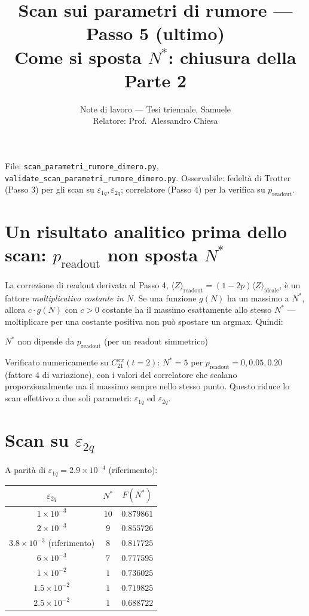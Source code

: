 \documentclass[11pt,a4paper]{article}
\title{\vspace{-1.5em}\color{inkblue}Scan sui parametri di rumore --- Passo 5 (ultimo)\\[0.2em]
\Large\normalfont\color{softgray}Come si sposta $N^*$: chiusura della Parte 2}
\author{Note di lavoro --- Tesi triennale, Samuele\\ Relatore: Prof.\ Alessandro Chiesa}
\date{}
\begin{document}
\sloppy
\maketitle
\thispagestyle{fancy}
\vspace{-2.2em}

File: \texttt{scan\_parametri\_rumore\_dimero.py},
\texttt{validate\_scan\_parametri\_rumore\_dimero.py}. Osservabile: fedeltà
di Trotter (Passo 3) per gli scan su $\varepsilon_{1q},\varepsilon_{2q}$;
correlatore (Passo 4) per la verifica su $p_\text{readout}$.

\section*{Un risultato analitico prima dello scan: $p_\text{readout}$ non sposta $N^*$}

La correzione di readout derivata al Passo 4, $\langle Z\rangle_\text{readout}=
(1-2p)\langle Z\rangle_\text{ideale}$, è un fattore \emph{moltiplicativo
costante in $N$}. Se una funzione $g(N)$ ha un massimo a $N^*$, allora
$c\cdot g(N)$ con $c>0$ costante ha il massimo esattamente allo stesso
$N^*$ --- moltiplicare per una costante positiva non può spostare un
argmax. Quindi:
\begin{keyeq}
\centering
$N^*$ non dipende da $p_\text{readout}$ (per un readout simmetrico)
\end{keyeq}
Verificato numericamente su $C_{21}^{xx}(t=2)$: $N^*=5$ per
$p_\text{readout}=0, 0.05, 0.20$ (fattore 4 di variazione), con i valori
del correlatore che scalano proporzionalmente ma il massimo sempre nello
stesso punto. Questo riduce lo scan effettivo a due soli parametri:
$\varepsilon_{1q}$ ed $\varepsilon_{2q}$.

\section*{Scan su $\varepsilon_{2q}$}

A parità di $\varepsilon_{1q}=2.9\times10^{-4}$ (riferimento):

\begin{center}
\renewcommand{\arraystretch}{1.2}
\begin{tabular}{@{}ccc@{}}
\toprule
$\varepsilon_{2q}$ & $N^*$ & $F(N^*)$ \\
\midrule
$1\times10^{-3}$ & $10$ & $0.879861$ \\
$2\times10^{-3}$ & $9$ & $0.855726$ \\
$3.8\times10^{-3}$ (riferimento) & $8$ & $0.817725$ \\
$6\times10^{-3}$ & $7$ & $0.777595$ \\
$1\times10^{-2}$ & $1$ & $0.736025$ \\
$1.5\times10^{-2}$ & $1$ & $0.719825$ \\
$2.5\times10^{-2}$ & $1$ & $0.688722$ \\
\bottomrule
\end{tabular}
\end{center}
\end{document}
